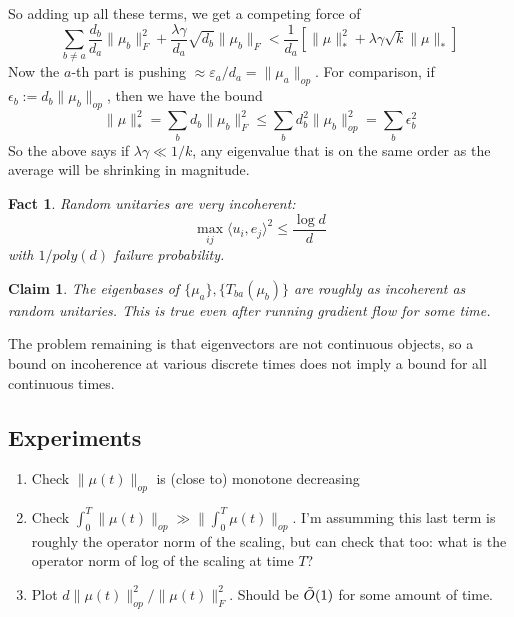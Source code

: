 \documentclass{article}
\newtheorem{fact}[theorem]{Fact}
\newtheorem{claim}[theorem]{Claim}
\newcommand\eps{\varepsilon}
\begin{document}
So adding up all these terms, we get a competing force of 
\[ \sum_{b \neq a} \frac{d_{b}}{d_{a}} \|\mu_{b}\|_{F}^{2} + \frac{\lambda \gamma}{d_{a}}  \sqrt{d_{b}} \|\mu_{b}\|_{F} < \frac{1}{d_{a}} \left[ \|\mu\|_{*}^{2} + \lambda \gamma \sqrt{k} \|\mu\|_{*}   \right]   \]
Now the $a$-th part is pushing $\approx \eps_{a}/d_{a} = \|\mu_{a}\|_{op}$. For comparison, if $\epsilon_{b} := d_{b} \|\mu_{b}\|_{op}$, then we have the bound
\[ \|\mu\|_{*}^{2} = \sum_{b} d_{b} \|\mu_{b}\|_{F}^{2} \leq \sum_{b} d_{b}^{2} \|\mu_{b}\|_{op}^{2} = \sum_{b} \epsilon_{b}^{2}   \]
So the above says if $\lambda \gamma \ll 1/k$, any eigenvalue that is on the same order as the average will be shrinking in magnitude. 

\begin{fact}
Random unitaries are very incoherent:
\[ \max_{ij} \langle u_{i}, e_{j} \rangle^{2} \leq \frac{\log d}{d}    \]
with $1/poly(d)$ failure probability. 
\end{fact}

\begin{claim}
The eigenbases of $\{\mu_{a}\}, \{T_{ba}(\mu_{b})\}$ are roughly as incoherent as random unitaries. This is true even after running gradient flow for some time. 
\end{claim}

The problem remaining is that eigenvectors are not continuous objects, so a bound on incoherence at various discrete times does not imply a bound for all continuous times. 







\subsection{Experiments}
\begin{enumerate}
    \item Check $\|\mu(t)\|_{op}$ is (close to) monotone decreasing
    \item Check $\int_{0}^{T} \|\mu(t)\|_{op} \gg \|\int_{0}^{T} \mu(t)\|_{op}$. I'm assumming this last term is roughly the operator norm of the scaling, but can check that too: what is the operator norm of log of the scaling at time $T$?
    \item Plot $d \|\mu(t)\|_{op}^{2} / \|\mu(t)\|_{F}^{2}$. Should be $\Tilde{O}(1)$ for some amount of time. 
\end{enumerate}
\end{document}
